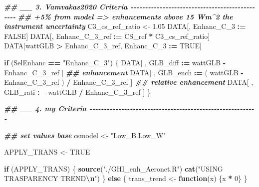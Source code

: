 \documentclass[
  10pt,
  a4paper,oneside]{article}
\newenvironment{Shaded}{\begin{snugshade}}{\end{snugshade}}
\newcommand{\ConstantTok}[1]{\textcolor[rgb]{0.56,0.35,0.01}{#1}}
\newcommand{\ControlFlowTok}[1]{\textcolor[rgb]{0.13,0.29,0.53}{\textbf{#1}}}
\newcommand{\DecValTok}[1]{\textcolor[rgb]{0.00,0.00,0.81}{#1}}
\newcommand{\DocumentationTok}[1]{\textcolor[rgb]{0.56,0.35,0.01}{\textbf{\textit{#1}}}}
\newcommand{\FloatTok}[1]{\textcolor[rgb]{0.00,0.00,0.81}{#1}}
\newcommand{\FunctionTok}[1]{\textcolor[rgb]{0.13,0.29,0.53}{\textbf{#1}}}
\newcommand{\NormalTok}[1]{#1}
\newcommand{\OtherTok}[1]{\textcolor[rgb]{0.56,0.35,0.01}{#1}}
\newcommand{\SpecialCharTok}[1]{\textcolor[rgb]{0.81,0.36,0.00}{\textbf{#1}}}
\newcommand{\StringTok}[1]{\textcolor[rgb]{0.31,0.60,0.02}{#1}}
\begin{document}
\begin{Shaded}
\begin{Highlighting}[]
\DocumentationTok{\#\# \_\_ 3. Vamvakas2020  Criteria  {-}{-}{-}{-}{-}{-}{-}{-}{-}{-}{-}{-}{-}{-}{-}{-}{-}{-}{-}{-}{-}{-}{-}{-}{-}{-}{-}{-}{-}{-}{-}{-}{-}{-}{-}{-}{-}{-}{-}{-}{-}{-}{-}{-}{-}{-}{-}}
\DocumentationTok{\#\# +5\% from model =\textgreater{} enhancements above 15 Wm\^{}2 the instrument uncertainty}
\NormalTok{C3\_cs\_ref\_ratio }\OtherTok{\textless{}{-}} \FloatTok{1.05}
\NormalTok{DATA[, Enhanc\_C\_3 }\SpecialCharTok{:=} \ConstantTok{FALSE}\NormalTok{]}
\NormalTok{DATA[, Enhanc\_C\_3\_ref }\SpecialCharTok{:=}\NormalTok{ CS\_ref }\SpecialCharTok{*}\NormalTok{ C3\_cs\_ref\_ratio]}
\NormalTok{DATA[wattGLB }\SpecialCharTok{\textgreater{}}\NormalTok{ Enhanc\_C\_3\_ref,}
\NormalTok{     Enhanc\_C\_3 }\SpecialCharTok{:=} \ConstantTok{TRUE}\NormalTok{]}

\ControlFlowTok{if}\NormalTok{ (SelEnhanc }\SpecialCharTok{==} \StringTok{"Enhanc\_C\_3"}\NormalTok{) \{}
\NormalTok{  DATA[ , GLB\_diff }\SpecialCharTok{:=}\NormalTok{   wattGLB }\SpecialCharTok{{-}}\NormalTok{ Enhanc\_C\_3\_ref                    ] }\DocumentationTok{\#\# enhancement}
\NormalTok{  DATA[ , GLB\_ench }\SpecialCharTok{:=}\NormalTok{ ( wattGLB }\SpecialCharTok{{-}}\NormalTok{ Enhanc\_C\_3\_ref ) }\SpecialCharTok{/}\NormalTok{ Enhanc\_C\_3\_ref ] }\DocumentationTok{\#\# relative enhancement}
\NormalTok{  DATA[ , GLB\_rati }\SpecialCharTok{:=}\NormalTok{   wattGLB }\SpecialCharTok{/}\NormalTok{ Enhanc\_C\_3\_ref                    ]}
\NormalTok{\}}



\DocumentationTok{\#\# \_\_ 4. my Criteria  {-}{-}{-}{-}{-}{-}{-}{-}{-}{-}{-}{-}{-}{-}{-}{-}{-}{-}{-}{-}{-}{-}{-}{-}{-}{-}{-}{-}{-}{-}{-}{-}{-}{-}{-}{-}{-}{-}{-}{-}{-}{-}{-}{-}{-}{-}{-}{-}{-}{-}{-}{-}{-}{-}{-}{-}{-}{-}}

\DocumentationTok{\#\# set values base}
\NormalTok{csmodel }\OtherTok{\textless{}{-}} \StringTok{"Low\_B.Low\_W"}

\NormalTok{APPLY\_TRANS }\OtherTok{\textless{}{-}} \ConstantTok{TRUE}

\ControlFlowTok{if}\NormalTok{ (APPLY\_TRANS) \{}
  \FunctionTok{source}\NormalTok{(}\StringTok{"./GHI\_enh\_Aeronet.R"}\NormalTok{)}
  \FunctionTok{cat}\NormalTok{(}\StringTok{"USING TRASPARENCY TREND}\SpecialCharTok{\textbackslash{}n}\StringTok{"}\NormalTok{)}
\NormalTok{\} }\ControlFlowTok{else}\NormalTok{ \{}
\NormalTok{  trans\_trend }\OtherTok{\textless{}{-}} \ControlFlowTok{function}\NormalTok{(x) \{x }\SpecialCharTok{*} \DecValTok{0}\NormalTok{\}}
\NormalTok{\}}
\end{Highlighting}
\end{Shaded}
\end{document}
